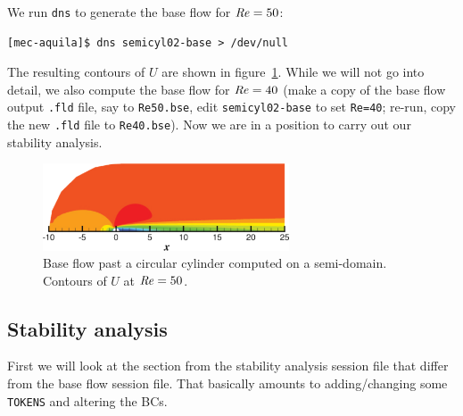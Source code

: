 \documentclass[11pt,a4paper]{report}
\newcommand\Rey{\mbox{\textit{Re}}}
\begin{document}
We run \verb+dns+ to generate the base flow for $\Rey=50$:
\begin{verbatim}
[mec-aquila]$ dns semicyl02-base > /dev/null
\end{verbatim}
\noindent
The resulting contours of $U$ are shown in figure~\ref{fig.semibase}.
While we will not go into detail, we also compute the base flow for
$\Rey=40$ (make a copy of the base flow output \verb+.fld+ file, say
to \verb+Re50.bse+, edit \verb+semicyl02-base+ to set \verb+Re=40+;
re-run, copy the new \verb+.fld+ file to \verb+Re40.bse+).  Now we are
in a position to carry out our stability analysis.
\begin{figure}
\begin{center}
\includegraphics[width=0.65\textwidth]{Re50_base_u.pdf}
\end{center}
\caption{Base flow past a circular cylinder computed on a
  semi-domain. Contours of $U$ at $\Rey=50$.}
\label{fig.semibase}
\end{figure}


\subsection{Stability analysis}

First we will look at the section from the stability analysis session
file that differ from the base flow session file. That basically
amounts to adding/changing some \verb+TOKENS+ and altering the BCs.
\end{document}
